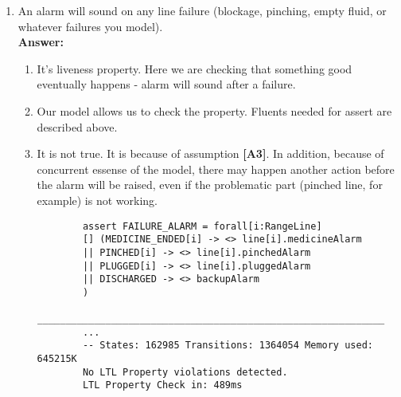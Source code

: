 \documentclass{article}
\begin{document}
\begin{enumerate}
    \item An alarm will sound on any line failure (blockage, pinching, empty fluid, or whatever failures you model). \\
    \textbf{Answer:}
    \begin{enumerate}
    	\item It's liveness property. Here we are checking that something good eventually happens - alarm will sound after a failure.
		\item Our model allows us to check the property. Fluents needed for assert are described above. 
		\item It is not true. It is because of assumption \textbf{[A3]}. In addition, because of concurrent essense of the model, there may happen another action before the alarm will be raised, even if the problematic part (pinched line, for example) is not working.
		\begin{verbatim}
		assert FAILURE_ALARM = forall[i:RangeLine] 
		[] (MEDICINE_ENDED[i] -> <> line[i].medicineAlarm 
		|| PINCHED[i] -> <> line[i].pinchedAlarm
		|| PLUGGED[i] -> <> line[i].pluggedAlarm
		|| DISCHARGED -> <> backupAlarm
		)
		_____________________________________________________________
		...
		-- States: 162985 Transitions: 1364054 Memory used: 645215K
		No LTL Property violations detected.
		LTL Property Check in: 489ms

		\end{verbatim}
	\end{enumerate}
	

\end{enumerate}
\end{document}
